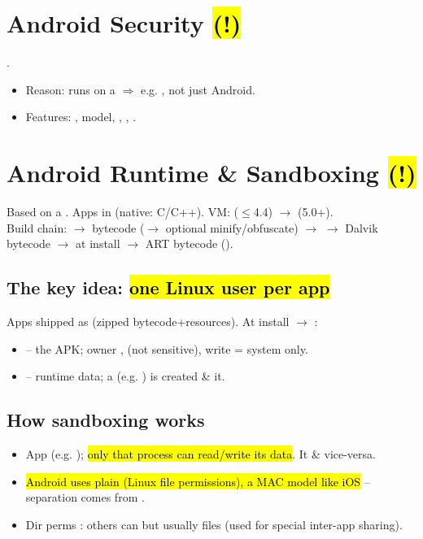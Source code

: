 \section{Android Security \hl{(!)}}
.
\begin{itemize}
\item Reason: runs on a  $\Rightarrow$ e.g. , not just Android.
\item Features: ,  model, , , .
\end{itemize}

\section{Android Runtime \& Sandboxing \hl{(!)}}
Based on a . Apps in  (native: C/C++). VM:  ($\le$4.4) $\to$  (5.0+).\\
Build chain:  $\to$ bytecode ($\to$ optional  minify/obfuscate) $\to$  $\to$ Dalvik bytecode $\to$ at install  $\to$ ART bytecode ().
\subsection{The key idea: \hl{one Linux user per app}}
Apps shipped as  (zipped bytecode+resources). At install $\to$ :
\begin{itemize}
\item {} -- the APK; owner ,  (not sensitive), write = system only.
\item {} -- runtime data; a  (e.g. ) is created \&  it.
\end{itemize}
\subsection{How sandboxing works}
\begin{itemize}
\item App  (e.g. ); \hl{only that process can read/write its data}. It  \& vice-versa.
\item \hl{Android uses plain  (Linux file permissions),  a MAC model like iOS} -- separation comes from .
\item Dir perms : others can  but usually  files (used for special inter-app sharing).
\end{itemize}


